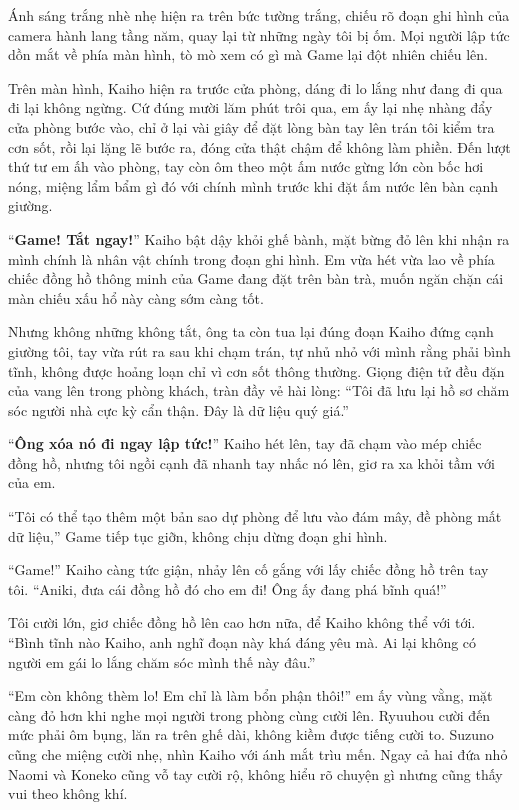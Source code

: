 \documentclass[../main.tex]{subfiles}
\begin{document}
Ánh sáng trắng nhè nhẹ hiện ra trên bức tường trắng, chiếu rõ đoạn ghi hình của camera hành lang tầng năm, quay lại từ những ngày tôi bị ốm. Mọi người lập tức dồn mắt về phía màn hình, tò mò xem có gì mà Game lại đột nhiên chiếu lên.

Trên màn hình, Kaiho hiện ra trước cửa phòng, dáng đi lo lắng như đang đi qua đi lại không ngừng. Cứ đúng mười lăm phút trôi qua, em ấy lại nhẹ nhàng đẩy cửa phòng bước vào, chỉ ở lại vài giây để đặt lòng bàn tay lên trán tôi kiểm tra cơn sốt, rồi lại lặng lẽ bước ra, đóng cửa thật chậm để không làm phiền. Đến lượt thứ tư em ấh vào phòng, tay còn ôm theo một ấm nước gừng lớn còn bốc hơi nóng, miệng lẩm bẩm gì đó với chính mình trước khi đặt ấm nước lên bàn cạnh giường.

``\textbf{Game! Tắt ngay!}'' Kaiho bật dậy khỏi ghế bành, mặt bừng đỏ lên khi nhận ra mình chính là nhân vật chính trong đoạn ghi hình. Em vừa hét vừa lao về phía chiếc đồng hồ thông minh của Game đang đặt trên bàn trà, muốn ngăn chặn cái màn chiếu xấu hổ này càng sớm càng tốt.

Nhưng không những không tắt, ông ta còn tua lại đúng đoạn Kaiho đứng cạnh giường tôi, tay vừa rút ra sau khi chạm trán, tự nhủ nhỏ với mình rằng phải bình tĩnh, không được hoảng loạn chỉ vì cơn sốt thông thường. Giọng điện tử đều đặn của vang lên trong phòng khách, tràn đầy vẻ hài lòng: ``Tôi đã lưu lại hồ sơ chăm sóc người nhà cực kỳ cẩn thận. Đây là dữ liệu quý giá.''

``\textbf{Ông xóa nó đi ngay lập tức!}'' Kaiho hét lên, tay đã chạm vào mép chiếc đồng hồ, nhưng tôi ngồi cạnh đã nhanh tay nhấc nó lên, giơ ra xa khỏi tầm với của em.

``Tôi có thể tạo thêm một bản sao dự phòng để lưu vào đám mây, đề phòng mất dữ liệu,'' Game tiếp tục giỡn, không chịu dừng đoạn ghi hình.

``Game!'' Kaiho càng tức giận, nhảy lên cố gắng với lấy chiếc đồng hồ trên tay tôi. ``Aniki, đưa cái đồng hồ đó cho em đi! Ông ấy đang phá bĩnh quá!''

Tôi cười lớn, giơ chiếc đồng hồ lên cao hơn nữa, để Kaiho không thể với tới. ``Bình tĩnh nào Kaiho, anh nghĩ đoạn này khá đáng yêu mà. Ai lại không có người em gái lo lắng chăm sóc mình thế này đâu.''

``Em còn không thèm lo! Em chỉ là làm bổn phận thôi!'' em ấy vùng vằng, mặt càng đỏ hơn khi nghe mọi người trong phòng cùng cười lên. Ryuuhou cười đến mức phải ôm bụng, lăn ra trên ghế dài, không kiềm được tiếng cười to. Suzuno cũng che miệng cười nhẹ, nhìn Kaiho với ánh mắt trìu mến. Ngay cả hai đứa nhỏ Naomi và Koneko cũng vỗ tay cười rộ, không hiểu rõ chuyện gì nhưng cũng thấy vui theo không khí.
\end{document}

